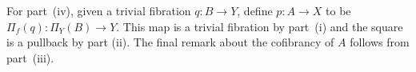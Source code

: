 \documentclass[reqno,10pt,a4paper,oneside,draft]{amsart}
\makeatletter
\renewenvironment{proof}[1][\proofname] {\par\pushQED{\qed}\normalfont\topsep6\p@\@plus6\p@\relax\trivlist\item[\hskip\labelsep\bf#1\@addpunct{.}]\ignorespaces}{\popQED\endtrivlist\@endpefalse}
\numberwithin{equation}{section}
\theoremstyle{mythm}
\theoremstyle{mydef}
\theoremstyle{myrmk}
\newcommand{\pullback}[1]{\save*!/#1-1.2pc/#1:(-1,1)@^{|-}\restore}
\newcommand{\drpullback}{\pullback{dr}}
\newcommand{\ie}{\text{i.e.\ }}
\newcommand{\co}{\colon}
\makeatother
\begin{document}
\begin{proof}

For part~(iv), given a trivial fibration $q \co B \to Y$, define $p \co A \to X$ to  be $\Pi_f(q) \co \Pi_Y(B) \to Y$. This map is a trivial fibration by part~(i) and the square is a pullback by part (ii). The final remark about the cofibrancy of $A$ follows from part~(iii). \qedhere
\end{proof}
\end{document}
